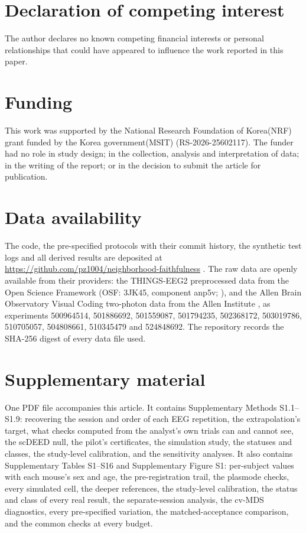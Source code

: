 \documentclass[11pt]{article}
\newcommand{\MouseExperimentIDs}{500964514, 501886692, 501559087, 501794235, 502368172, 503019786, 510705057, 504808661, 510345479 and 524848692}
\begin{document}
\section*{Declaration of competing interest}
The author declares no known competing financial interests or personal relationships that could have appeared to influence the work reported in this paper.

\section*{Funding}
This work was supported by the National Research Foundation of Korea(NRF) grant funded by the Korea government(MSIT) (RS-2026-25602117).
The funder had no role in study design; in the collection, analysis and interpretation of data; in the writing of the report; or in the decision to submit the article for publication.

\section*{Data availability}
The code, the pre-specified protocols with their commit history, the synthetic test logs and all derived results are deposited at \url{https://github.com/pz1004/neighborhood-faithfulness} \citep{jang2026code}.
The raw data are openly available from their providers: the THINGS-EEG2 preprocessed data from the Open Science Framework (OSF: 3JK45, component anp5v; \citealp{gifford2021data}), and the Allen Brain Observatory Visual Coding two-photon data from the Allen Institute \citep{allen2016data}, as experiments \MouseExperimentIDs.
The repository records the SHA-256 digest of every data file used.

\section*{Supplementary material}
One PDF file accompanies this article.
It contains Supplementary Methods S1.1--S1.9: recovering the session and order of each EEG repetition, the extrapolation's target, what checks computed from the analyst's own trials can and cannot see, the scDEED null, the pilot's certificates, the simulation study, the statuses and classes, the study-level calibration, and the sensitivity analyses.
It also contains Supplementary Tables S1--S16 and Supplementary Figure S1: per-subject values with each mouse's sex and age, the pre-registration trail, the plasmode checks, every simulated cell, the deeper references, the study-level calibration, the status and class of every real result, the separate-session analysis, the cv-MDS diagnostics, every pre-specified variation, the matched-acceptance comparison, and the common checks at every budget.
\end{document}
